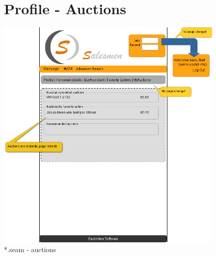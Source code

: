 \documentclass[salesmen, twoside]{../../../templates/latex/2009/softproj}
\begin{document}
\begin{projdoc}
\begin{figure}
\section{Profile - Auctions}
\label{fig_prototype_profile_auctions}
\includegraphics[width=15cm]{../../img/SM_mySM_auctions.png}
\caption{*.seam - auctions}
\end{figure}
\begin{figure}

\end{figure}
\end{projdoc}
\end{document}

